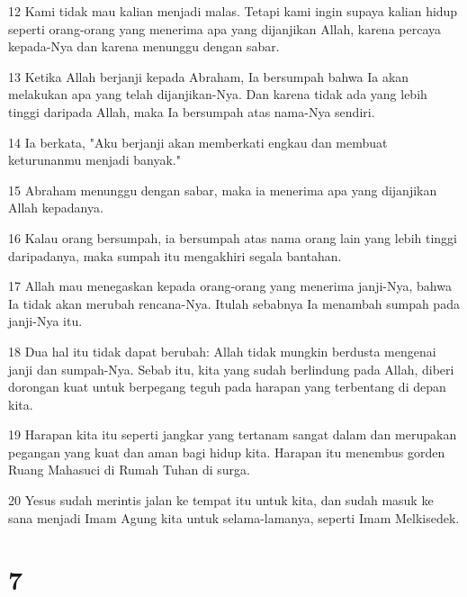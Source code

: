 \par 12 Kami tidak mau kalian menjadi malas. Tetapi kami ingin supaya kalian hidup seperti orang-orang yang menerima apa yang dijanjikan Allah, karena percaya kepada-Nya dan karena menunggu dengan sabar.
\par 13 Ketika Allah berjanji kepada Abraham, Ia bersumpah bahwa Ia akan melakukan apa yang telah dijanjikan-Nya. Dan karena tidak ada yang lebih tinggi daripada Allah, maka Ia bersumpah atas nama-Nya sendiri.
\par 14 Ia berkata, "Aku berjanji akan memberkati engkau dan membuat keturunanmu menjadi banyak."
\par 15 Abraham menunggu dengan sabar, maka ia menerima apa yang dijanjikan Allah kepadanya.
\par 16 Kalau orang bersumpah, ia bersumpah atas nama orang lain yang lebih tinggi daripadanya, maka sumpah itu mengakhiri segala bantahan.
\par 17 Allah mau menegaskan kepada orang-orang yang menerima janji-Nya, bahwa Ia tidak akan merubah rencana-Nya. Itulah sebabnya Ia menambah sumpah pada janji-Nya itu.
\par 18 Dua hal itu tidak dapat berubah: Allah tidak mungkin berdusta mengenai janji dan sumpah-Nya. Sebab itu, kita yang sudah berlindung pada Allah, diberi dorongan kuat untuk berpegang teguh pada harapan yang terbentang di depan kita.
\par 19 Harapan kita itu seperti jangkar yang tertanam sangat dalam dan merupakan pegangan yang kuat dan aman bagi hidup kita. Harapan itu menembus gorden Ruang Mahasuci di Rumah Tuhan di surga.
\par 20 Yesus sudah merintis jalan ke tempat itu untuk kita, dan sudah masuk ke sana menjadi Imam Agung kita untuk selama-lamanya, seperti Imam Melkisedek.

\chapter{7}

